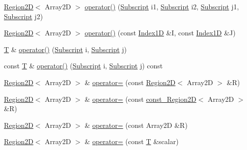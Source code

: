 \begin{DoxyCompactItemize}
\item 
\hyperlink{class_t_n_t_1_1_region2_d}{Region2D}$<$ Array2D $>$ \hyperlink{class_t_n_t_1_1_region2_d_a468b2e6cc605086bff29ba01a10200e8}{operator()} (\hyperlink{namespace_t_n_t_af22e3f1460e145c04ce4e7d701e4c1c1}{Subscript} i1, \hyperlink{namespace_t_n_t_af22e3f1460e145c04ce4e7d701e4c1c1}{Subscript} i2, \hyperlink{namespace_t_n_t_af22e3f1460e145c04ce4e7d701e4c1c1}{Subscript} j1, \hyperlink{namespace_t_n_t_af22e3f1460e145c04ce4e7d701e4c1c1}{Subscript} j2)
\item 
\hyperlink{class_t_n_t_1_1_region2_d}{Region2D}$<$ Array2D $>$ \hyperlink{class_t_n_t_1_1_region2_d_a3b2f505f76c7e0269feb8fd2f4bc0454}{operator()} (const \hyperlink{class_t_n_t_1_1_index1_d}{Index1D} \&I, const \hyperlink{class_t_n_t_1_1_index1_d}{Index1D} \&J)
\item 
\hyperlink{class_t_n_t_1_1_region2_d_a2780b0cebcd8d0601644c7b591b47c2d}{T} \& \hyperlink{class_t_n_t_1_1_region2_d_a28bab6eb1f2ac17422d2e02d2fe19692}{operator()} (\hyperlink{namespace_t_n_t_af22e3f1460e145c04ce4e7d701e4c1c1}{Subscript} i, \hyperlink{namespace_t_n_t_af22e3f1460e145c04ce4e7d701e4c1c1}{Subscript} j)
\item 
const \hyperlink{class_t_n_t_1_1_region2_d_a2780b0cebcd8d0601644c7b591b47c2d}{T} \& \hyperlink{class_t_n_t_1_1_region2_d_a86bba42291ce9c6af39e954034d32fb2}{operator()} (\hyperlink{namespace_t_n_t_af22e3f1460e145c04ce4e7d701e4c1c1}{Subscript} i, \hyperlink{namespace_t_n_t_af22e3f1460e145c04ce4e7d701e4c1c1}{Subscript} j) const 
\item 
\hyperlink{class_t_n_t_1_1_region2_d}{Region2D}$<$ Array2D $>$ \& \hyperlink{class_t_n_t_1_1_region2_d_addd3b602ffb982f35b0a189932a77c5c}{operator=} (const \hyperlink{class_t_n_t_1_1_region2_d}{Region2D}$<$ Array2D $>$ \&R)
\item 
\hyperlink{class_t_n_t_1_1_region2_d}{Region2D}$<$ Array2D $>$ \& \hyperlink{class_t_n_t_1_1_region2_d_ae0e310bafdfd47ccb7c0b77144ff5370}{operator=} (const \hyperlink{class_t_n_t_1_1const___region2_d}{const\_\-Region2D}$<$ Array2D $>$ \&R)
\item 
\hyperlink{class_t_n_t_1_1_region2_d}{Region2D}$<$ Array2D $>$ \& \hyperlink{class_t_n_t_1_1_region2_d_ae290d8b013acb2506d985c00c8da2a2f}{operator=} (const Array2D \&R)
\item 
\hyperlink{class_t_n_t_1_1_region2_d}{Region2D}$<$ Array2D $>$ \& \hyperlink{class_t_n_t_1_1_region2_d_a4433f8c8bfd4e5a2435fcb29fce2f13c}{operator=} (const \hyperlink{class_t_n_t_1_1_region2_d_a2780b0cebcd8d0601644c7b591b47c2d}{T} \&scalar)
\end{DoxyCompactItemize}
